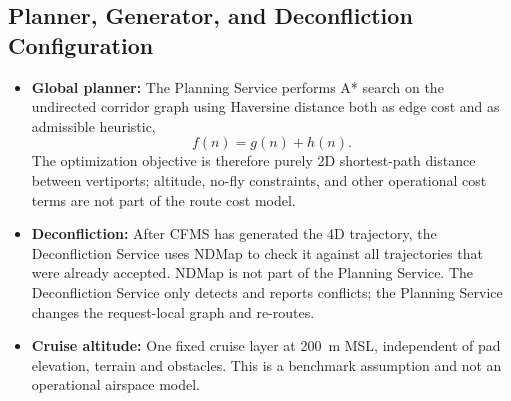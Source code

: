 \subsection{Planner, Generator, and Deconfliction Configuration}
\label{sec:planner_configuration}

\begin{itemize}
    \item \textbf{Global planner:} The Planning Service performs A* search on the undirected corridor graph using Haversine distance both as edge cost and as admissible heuristic,
    \[
        f(n) = g(n) + h(n).
    \]
    The optimization objective is therefore purely 2D shortest-path distance between vertiports; altitude, no-fly constraints, and other operational cost terms are not part of the route cost model.

    \item \textbf{Deconfliction:} After CFMS has generated the 4D trajectory, the Deconfliction Service uses NDMap to check it against all trajectories that were already accepted. NDMap is not part of the Planning Service. The Deconfliction Service only detects and reports conflicts; the Planning Service changes the request-local graph and re-routes.

    \item \textbf{Cruise altitude:} One fixed cruise layer at \SI{200}{m} MSL, independent of pad elevation, terrain and obstacles. This is a benchmark assumption and not an operational airspace model.


\end{itemize}
